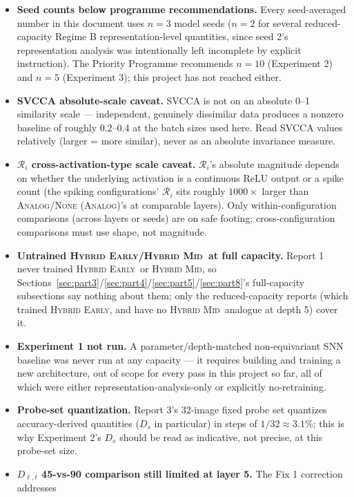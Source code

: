 \documentclass[11pt]{article}
\newcommand{\Analog}{\textsc{Analog}}
\newcommand{\None}{\textsc{None (Analog)}}
\newcommand{\HybridEarly}{\textsc{Hybrid Early}}
\newcommand{\HybridMid}{\textsc{Hybrid Mid}}
\begin{document}
\begin{itemize}[leftmargin=1.8em]
\item \textbf{Seed counts below programme recommendations.} Every seed-averaged number in this document
uses $n{=}3$ model seeds ($n{=}2$ for several reduced-capacity Regime B representation-level quantities,
since seed 2's representation analysis was intentionally left incomplete by explicit instruction). The
Priority Programme recommends $n{=}10$ (Experiment 2) and $n{=}5$ (Experiment 3); this project has not
reached either.
\item \textbf{SVCCA absolute-scale caveat.} SVCCA is not on an absolute 0--1 similarity scale ---
independent, genuinely dissimilar data produces a nonzero baseline of roughly 0.2--0.4 at the batch
sizes used here. Read SVCCA values relatively (larger = more similar), never as an absolute invariance
measure.
\item \textbf{$\mathcal{R}_i$ cross-activation-type scale caveat.} $\mathcal{R}_i$'s absolute magnitude
depends on whether the underlying activation is a continuous ReLU output or a spike count (the spiking
configurations' $\mathcal{R}_i$ sits roughly $1000\times$ larger than \Analog/\None's at comparable
layers). Only within-configuration comparisons (across layers or seeds) are on safe footing;
cross-configuration comparisons must use shape, not magnitude.
\item \textbf{Untrained \HybridEarly/\HybridMid\ at full capacity.} Report 1 never trained \HybridEarly\
or \HybridMid, so Sections~\ref{sec:part3}/\ref{sec:part4}/\ref{sec:part5}/\ref{sec:part8}'s
full-capacity subsections say nothing about them; only the reduced-capacity reports (which trained
\HybridEarly, and have no \HybridMid\ analogue at depth 5) cover it.
\item \textbf{Experiment 1 not run.} A parameter/depth-matched non-equivariant SNN baseline was never
run at any capacity --- it requires building and training a new architecture, out of scope for every
pass in this project so far, all of which were either representation-analysis-only or explicitly
no-retraining.
\item \textbf{Probe-set quantization.} Report 3's 32-image fixed probe set quantizes accuracy-derived
quantities ($D_s$ in particular) in steps of $1/32 \approx 3.1\%$; this is why Experiment 2's $D_s$
should be read as indicative, not precise, at this probe-set size.
\item \textbf{$D_{\ell,t}$ 45-vs-90 comparison still limited at layer 5.} The Fix 1 correction addresses

\end{itemize}
\end{document}
